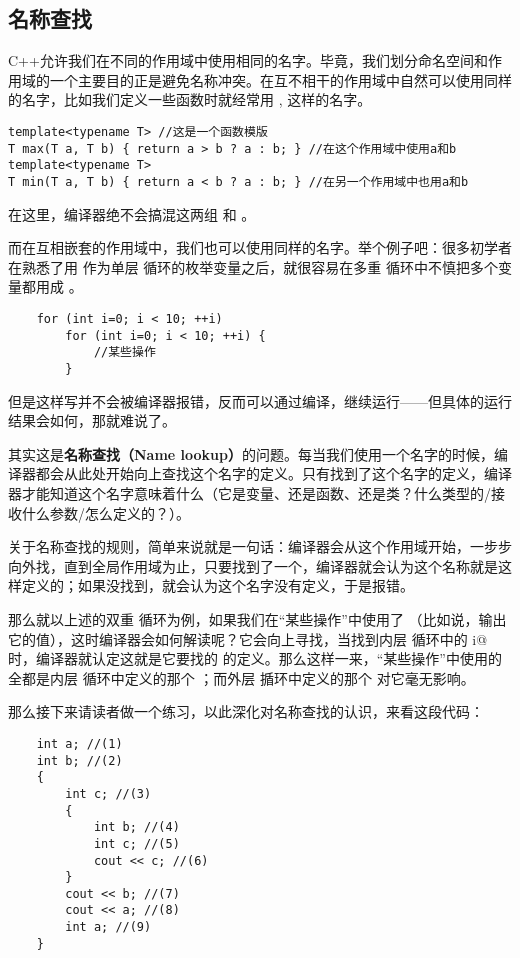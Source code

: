 \subsection*{名称查找}
C++允许我们在不同的作用域中使用相同的名字。毕竟，我们划分命名空间和作用域的一个主要目的正是避免名称冲突。在互不相干的作用域中自然可以使用同样的名字，比如我们定义一些函数时就经常用 \lstinline@a@, \lstinline@b@ 这样的名字。
\begin{lstlisting}
template<typename T> //这是一个函数模版
T max(T a, T b) { return a > b ? a : b; } //在这个作用域中使用a和b
template<typename T>
T min(T a, T b) { return a < b ? a : b; } //在另一个作用域中也用a和b
\end{lstlisting}
在这里，编译器绝不会搞混这两组 \lstinline@a@ 和 \lstinline@b@。\par
而在互相嵌套的作用域中，我们也可以使用同样的名字。举个例子吧：很多初学者在熟悉了用 \lstinline@i@ 作为单层 \lstinline@for@ 循环的枚举变量之后，就很容易在多重 \lstinline@for@ 循环中不慎把多个变量都用成 \lstinline@i@。
\begin{lstlisting}
    for (int i=0; i < 10; ++i) 
        for (int i=0; i < 10; ++i) {
            //某些操作
        }
\end{lstlisting}
但是这样写并不会被编译器报错，反而可以通过编译，继续运行——但具体的运行结果会如何，那就难说了。\par
其实这是\textbf{名称查找（Name lookup）}的问题。每当我们使用一个名字的时候，编译器都会从此处开始向上查找这个名字的定义。只有找到了这个名字的定义，编译器才能知道这个名字意味着什么（它是变量、还是函数、还是类？什么类型的/接收什么参数/怎么定义的？）。\par
关于名称查找的规则，简单来说就是一句话：编译器会从这个作用域开始，一步步向外找，直到全局作用域为止，只要找到了一个，编译器就会认为这个名称就是这样定义的；如果没找到，就会认为这个名字没有定义，于是报错。\par
那么就以上述的双重 \lstinline@for@ 循环为例，如果我们在``某些操作''中使用了 \lstinline@i@（比如说，输出它的值），这时编译器会如何解读呢？它会向上寻找，当找到内层 \lstinline@for@ 循环中的 \lstinline@int i@ 时，编译器就认定这就是它要找的 \lstinline@i@ 的定义。那么这样一来，``某些操作''中使用的 \lstinline@i@ 全都是内层 \lstinline@for@ 循环中定义的那个 \lstinline@i@；而外层 \lstinline@for@ 揗环中定义的那个 \lstinline@i@ 对它毫无影响。\par
那么接下来请读者做一个练习，以此深化对名称查找的认识，来看这段代码：
\begin{lstlisting}
    int a; //(1)
    int b; //(2)
    {
        int c; //(3)
        {
            int b; //(4)
            int c; //(5)
            cout << c; //(6)
        }
        cout << b; //(7)
        cout << a; //(8)
        int a; //(9)
    }
\end{lstlisting}
